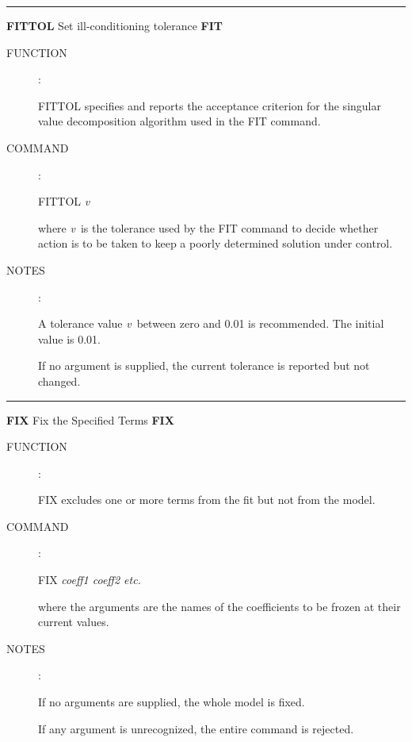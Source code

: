 \goodbreak
\rule{\textwidth}{0.3mm}
{\Large {\bf FITTOL} \hfill Set ill-conditioning tolerance \hfill {\bf FIT}}
\begin{description}
\item [FUNCTION]:


FITTOL specifies and reports the acceptance criterion
for the singular value decomposition algorithm used in the FIT
command.

\item [COMMAND]:

\begin{cmd}
\> \> FITTOL {\it v}
\end{cmd}

where {\it v}\, is the tolerance used by the FIT command to decide
whether action is to be taken to keep a poorly determined
solution under control.

\item [NOTES]:

A tolerance value {\it v}\, between zero and 0.01 is recommended.
The initial value is 0.01.

If no argument is supplied, the current tolerance is
reported but not changed.

\end{description}


\goodbreak
\rule{\textwidth}{0.3mm}
{\Large {\bf FIX} \hfill Fix the Specified Terms \hfill {\bf FIX}}
\begin{description}
\item [FUNCTION]:

FIX excludes one or more terms from the fit
but not from the model.

\item [COMMAND]:

\begin{cmd}
\> \> FIX {\it coeff1 coeff2 etc.}
\end{cmd}

where the arguments are the names of the coefficients to
be frozen at their current values.

\item [NOTES]:

If no arguments are supplied, the whole model is fixed.

If any argument is unrecognized, the entire command is rejected.

\end{description}

